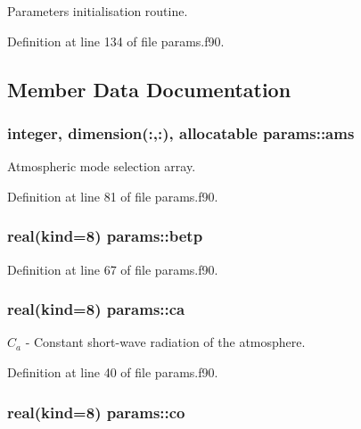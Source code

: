Parameters initialisation routine. 



Definition at line 134 of file params.\-f90.



\subsection{Member Data Documentation}
\hypertarget{classparams_aa95299f1a9c54693b85e049004369089}{
\subsubsection[{ams}]{\setlength{\rightskip}{0pt plus 5cm}integer, dimension(\-:,\-:), allocatable params\-::ams}}\label{classparams_aa95299f1a9c54693b85e049004369089}


Atmospheric mode selection array. 



Definition at line 81 of file params.\-f90.

\hypertarget{classparams_a9ffe87bb8aaab8a0d4f8d5f644b98785}{
\subsubsection[{betp}]{\setlength{\rightskip}{0pt plus 5cm}real(kind=8) params\-::betp}}\label{classparams_a9ffe87bb8aaab8a0d4f8d5f644b98785}


Definition at line 67 of file params.\-f90.

\hypertarget{classparams_a39788da6872d45cd235d734a6f60ac20}{
\subsubsection[{ca}]{\setlength{\rightskip}{0pt plus 5cm}real(kind=8) params\-::ca}}\label{classparams_a39788da6872d45cd235d734a6f60ac20}


$C_a$ -\/ Constant short-\/wave radiation of the atmosphere. 



Definition at line 40 of file params.\-f90.

\hypertarget{classparams_a36a35eafddb662c94c227a30cbf85fd4}{
\subsubsection[{co}]{\setlength{\rightskip}{0pt plus 5cm}real(kind=8) params\-::co}}\label{classparams_a36a35eafddb662c94c227a30cbf85fd4}


